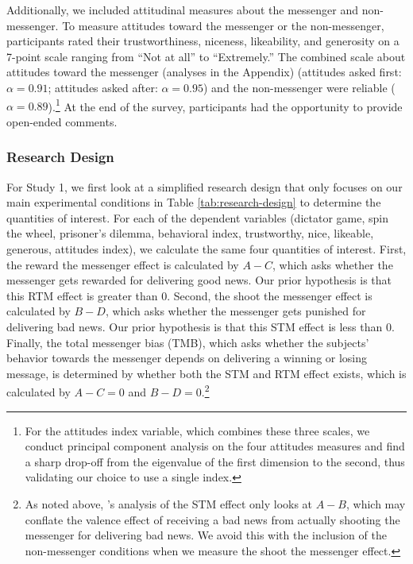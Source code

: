 Additionally, we included attitudinal measures about the messenger and
non-messenger. To measure attitudes toward the messenger or the
non-messenger, participants rated their trustworthiness, niceness,
likeability, and generosity on a 7-point scale ranging from ``Not at
all'' to ``Extremely.'' The combined scale about attitudes toward the
messenger (analyses in the Appendix) (attitudes asked first: $\alpha =
0.91$; attitudes asked after: $\alpha = 0.95$) and the non-messenger were
reliable ($\alpha = 0.89$).\footnote{For the attitudes index variable, which combines these three scales,
we conduct principal component analysis on the four attitudes measures 
and find a sharp drop-off from the eigenvalue of the first dimension
to the second, thus validating our choice to use a single index.} At the end of the survey, participants had the
opportunity to provide open-ended comments.

\subsubsection{Research Design}



For Study 1, we first look at a simplified research design that only
focuses on our main experimental conditions in Table \ref{tab:research-design} to determine the
quantities of interest. For each of the dependent variables (dictator
game, spin the wheel, prisoner's dilemma, behavioral index, trustworthy,
nice, likeable, generous, attitudes index), we calculate the same four
quantities of interest. First, the reward the messenger effect is
calculated by $A-C$, which asks whether the messenger gets rewarded
for delivering good news. Our prior hypothesis is that this RTM effect
is greater than 0. Second, the shoot the messenger effect is calculated
by $B-D$, which asks whether the messenger gets punished for
delivering bad news. Our prior hypothesis is that this STM effect is
less than 0. Finally, the total messenger bias (TMB), which asks whether
the subjects' behavior towards the messenger depends on delivering a
winning or losing message, is determined by whether both the STM and RTM
effect exists, which is calculated by $A-C = 0$ and $B-D =
0$.\footnote{As noted above, \citet{john2019shooting}'s analysis of the STM effect
 only looks at $A-B$, which may conflate the valence effect
  of receiving a bad news from actually shooting the messenger for
  delivering bad news. We avoid this with the inclusion of the
  non-messenger conditions when we measure the shoot the messenger
  effect.}

